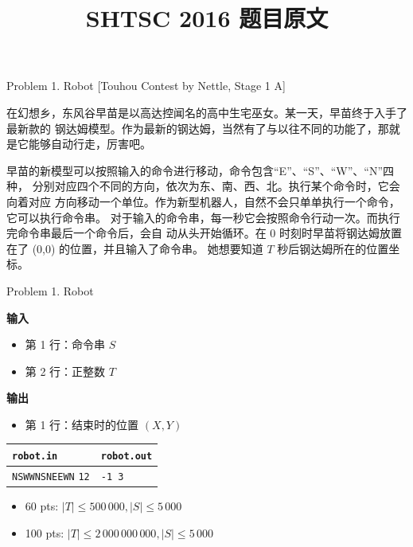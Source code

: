 \documentclass[UTF8]{beamer}
\begin{document}
\title{SHTSC 2016 题目原文}
\frame{\titlepage}


\begin{frame}{Problem 1. Robot}
[Touhou Contest by Nettle, Stage 1 A]

在幻想乡，东风谷早苗是以高达控闻名的高中生宅巫女。某一天，早苗终于入手了最新款的
钢达姆模型。作为最新的钢达姆，当然有了与以往不同的功能了，那就是它能够自动行走，厉害吧。

早苗的新模型可以按照输入的命令进行移动，命令包含“E”、“S”、“W”、“N”四种，
分别对应四个不同的方向，依次为东、南、西、北。执行某个命令时，它会向着对应
方向移动一个单位。作为新型机器人，自然不会只单单执行一个命令，它可以执行命令串。
对于输入的命令串，每一秒它会按照命令行动一次。而执行完命令串最后一个命令后，会自
动从头开始循环。在 0 时刻时早苗将钢达姆放置在了 (0,0) 的位置，并且输入了命令串。
她想要知道 $T$ 秒后钢达姆所在的位置坐标。

\end{frame}

\begin{frame}{Problem 1. Robot}

\textbf{输入}
\begin{itemize}
    \item 第 1 行：命令串 $S$
    \item 第 2 行：正整数 $T$
\end{itemize}
\textbf{输出}
\begin{itemize}
    \item 第 1 行：结束时的位置 $(X, Y)$
\end{itemize}

\begin{tabularx}{\textwidth}{|X|X|}
\hline
\texttt{\textbf{robot.in}} & \texttt{\textbf{robot.out}} \\ \hline
\texttt{NSWWNSNEEWN}\newline
\texttt{12}
&
\texttt{-1 3}
\\ \hline
\end{tabularx}
\newline
\begin{itemize}
    \item 60 pts: $|T| \leq 500\,000, |S| \leq 5\,000$
    \item 100 pts: $|T| \leq 2\,000\,000\,000, |S| \leq 5\,000$
\end{itemize}

\end{frame}
\end{document}
